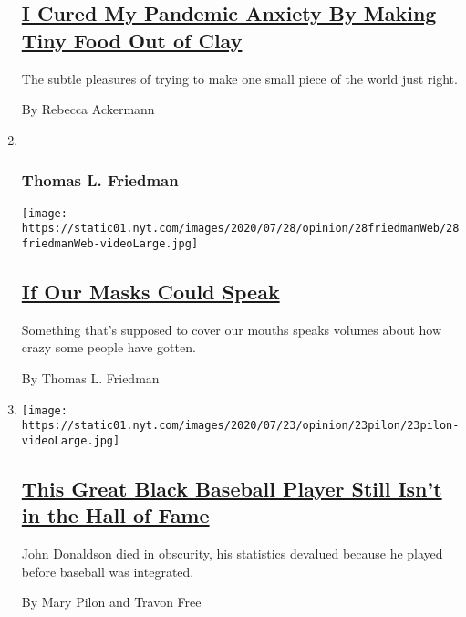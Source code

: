 \begin{enumerate}
  \hypertarget{i-cured-my-pandemic-anxiety-by-making-tiny-food-out-of-clay}{%
  \subsection{\texorpdfstring{\href{/2020/07/29/opinion/food-covid-quarantine-clay.html}{I
  Cured My Pandemic Anxiety By Making Tiny Food Out of
  Clay}}{I Cured My Pandemic Anxiety By Making Tiny Food Out of Clay}}\label{i-cured-my-pandemic-anxiety-by-making-tiny-food-out-of-clay}}

  The subtle pleasures of trying to make one small piece of the world
  just right.

  By Rebecca Ackermann
\item ~
  \hypertarget{thomas-l-friedman}{%
  \subsubsection{Thomas L. Friedman}\label{thomas-l-friedman}}

  \texttt{[image: https://static01.nyt.com/images/2020/07/28/opinion/28friedmanWeb/28friedmanWeb-videoLarge.jpg]}

  \hypertarget{if-our-masks-could-speak}{%
  \subsection{\texorpdfstring{\href{/2020/07/28/opinion/coronavirus-masks.html}{If
  Our Masks Could
  Speak}}{If Our Masks Could Speak}}\label{if-our-masks-could-speak}}

  Something that's supposed to cover our mouths speaks volumes about how
  crazy some people have gotten.

  By Thomas L. Friedman
\item
  \texttt{[image: https://static01.nyt.com/images/2020/07/23/opinion/23pilon/23pilon-videoLarge.jpg]}

  \hypertarget{this-great-black-baseball-player-still-isnt-in-the-hall-of-fame}{%
  \subsection{\texorpdfstring{\href{/2020/07/29/opinion/john-donaldson-baseball-black-players.html}{This
  Great Black Baseball Player Still Isn't in the Hall of
  Fame}}{This Great Black Baseball Player Still Isn't in the Hall of Fame}}\label{this-great-black-baseball-player-still-isnt-in-the-hall-of-fame}}

  John Donaldson died in obscurity, his statistics devalued because he
  played before baseball was integrated.

  By Mary Pilon and Travon Free
\end{enumerate}

